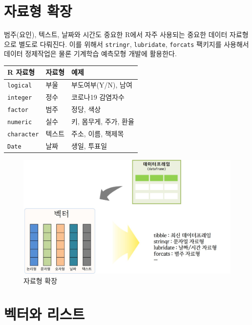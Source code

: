 \documentclass[
  letterpaper,
  chapter,a4paper,showtrims,openright,hidelinks]{oblivoir}
\begin{document}
\hypertarget{extended-data-type}{%
\section{자료형 확장}\label{extended-data-type}}

범주(요인), 텍스트, 날짜와 시간도 중요한 R에서 자주 사용되는 중요한
데이터 자료형으로 별도로 다뤄진다. 이를 위해서 \texttt{stringr},
\texttt{lubridate}, \texttt{forcats} 팩키지를 사용해서 데이터 정제작업은
물론 기계학습 예측모형 개발에 활용한다.

\begin{longtable}[]{@{}lll@{}}
\toprule\noalign{}
R 자료형 & 자료형 & 예제 \\
\midrule\noalign{}
\endhead
\bottomrule\noalign{}
\endlastfoot
\texttt{logical} & 부울 & 부도여부(Y/N), 남여 \\
\texttt{integer} & 정수 & 코로나19 감염자수 \\
\texttt{factor} & 범주 & 정당, 색상 \\
\texttt{numeric} & 실수 & 키, 몸무게, 주가, 환율 \\
\texttt{character} & 텍스트 & 주소, 이름, 책제목 \\
\texttt{Date} & 날짜 & 생일, 투표일 \\
\end{longtable}

\begin{figure}

{\centering \includegraphics{images/data_vectors.jpg}

}

\caption{자료형 확장}

\end{figure}

\hypertarget{uxbca1uxd130uxc640-uxb9acuxc2a4uxd2b8}{%
\section{벡터와 리스트}\label{uxbca1uxd130uxc640-uxb9acuxc2a4uxd2b8}}
\end{document}
